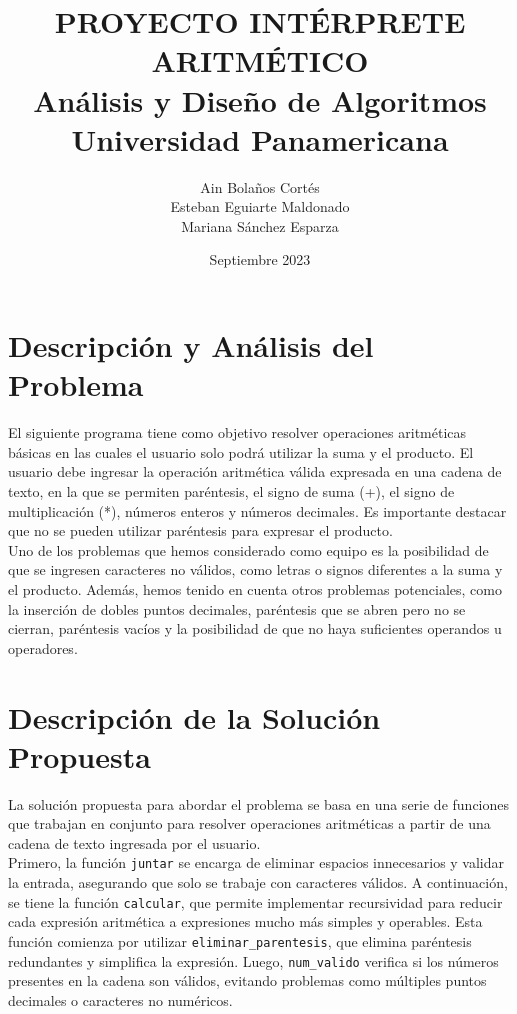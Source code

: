 \documentclass{article}
\title{PROYECTO INTÉRPRETE ARITMÉTICO \\ Análisis y Diseño de Algoritmos \\ Universidad Panamericana}
\author{Ain Bolaños Cortés\\Esteban Eguiarte Maldonado\\Mariana Sánchez Esparza}
\date{Septiembre 2023}
\begin{document}
\maketitle

\section{Descripción y Análisis del Problema}
El siguiente programa tiene como objetivo resolver operaciones aritméticas básicas en las cuales el usuario solo podrá utilizar la suma y el producto. El usuario debe ingresar la operación aritmética válida expresada en una cadena de texto, en la que se permiten paréntesis, el signo de suma (+), el signo de multiplicación (*), números enteros y números decimales. Es importante destacar que no se pueden utilizar paréntesis para expresar el producto.\\

Uno de los problemas que hemos considerado como equipo es la posibilidad de que se ingresen caracteres no válidos, como letras o signos diferentes a la suma y el producto. Además, hemos tenido en cuenta otros problemas potenciales, como la inserción de dobles puntos decimales, paréntesis que se abren pero no se cierran, paréntesis vacíos y la posibilidad de que no haya suficientes operandos u operadores.\\


\section{Descripción de la Solución Propuesta}
La solución propuesta para abordar el problema se basa en una serie de funciones que trabajan en conjunto para resolver operaciones aritméticas a partir de una cadena de texto ingresada por el usuario.\\

Primero, la función \texttt{juntar} se encarga de eliminar espacios innecesarios y validar la entrada, asegurando que solo se trabaje con caracteres válidos. A continuación, se tiene la función \texttt{calcular}, que permite implementar recursividad para reducir cada expresión aritmética a expresiones mucho más simples y operables. Esta función comienza por utilizar \texttt{eliminar_parentesis}, que elimina paréntesis redundantes y simplifica la expresión. Luego, \texttt{num_valido} verifica si los números presentes en la cadena son válidos, evitando problemas como múltiples puntos decimales o caracteres no numéricos.\\
\end{document}
